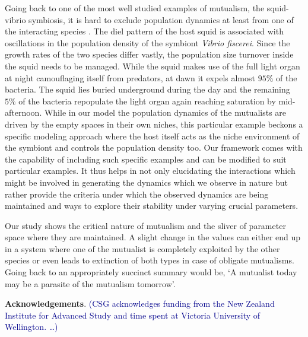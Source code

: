 \documentclass[12pt]{article}
\newcommand{\cha}[1]{\textcolor{darkblue}{(#1)}}
\begin{document}
Going back to one of the most well studied examples of mutualism, the squid-vibrio symbiosis, it is hard to exclude population dynamics at least from one of the interacting species \citep{nyholm:NRM:2004}.
The diel pattern of the host squid is associated with oscillations in the population density of the symbiont \textit{Vibrio fiscerei}.
Since the growth rates of the two species differ vastly, the population size turnover inside the squid needs to be managed.
While the squid makes use of the full light organ at night camouflaging itself from predators, at dawn it expels almost $95\%$ of the bacteria.
The squid lies buried underground during the day and the remaining $5\%$ of the bacteria repopulate the light organ again reaching saturation by mid-afternoon.
While in our model the population dynamics of the mutualists are driven by the empty spaces in their own niches, this particular example beckons a specific modeling approach where the host itself acts as the niche environment of the symbiont and controls the population density too.
Our framework comes with the capability of including such specific examples and can be modified to suit particular examples.
It thus helps in not only elucidating the interactions which might be involved in generating the dynamics which we observe in nature but rather provide the criteria under which the observed dynamics are being maintained and ways to explore their stability under varying crucial parameters. 

Our study shows the critical nature of mutualism and the sliver of parameter space where they are maintained. 
A slight change in the values can either end up in a system where one of the mutualist is completely exploited by the other species or even leads to extinction of both types in case of obligate mutualisms.
Going back to \cite{janzen:bookchapter:1985} an appropriately succinct summary would be,
`A mutualist today may be a parasite of the mutualism tomorrow'.

\textbf{Acknowledgements}. \cha{CSG acknowledges funding from the New Zealand Institute for Advanced Study and time spent at Victoria University of Wellington. \ldots }



%

%
\end{document}
